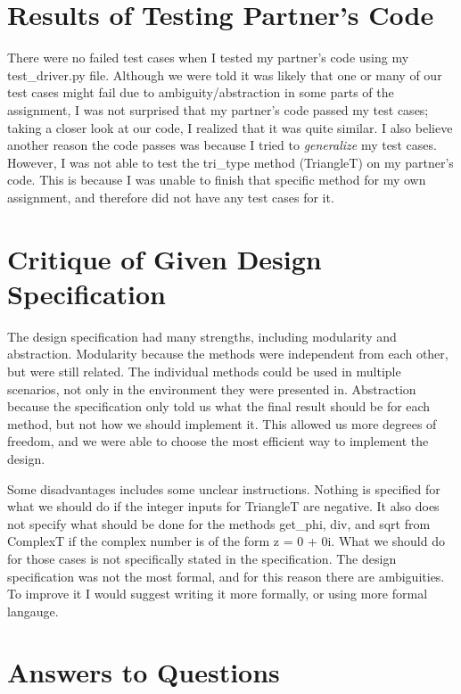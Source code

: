 \documentclass[12pt]{article}
\begin{document}
\section{Results of Testing Partner's Code}

There were no failed test cases when I tested my partner's code using my test\_driver.py file. Although we were told it was likely that one or many of our test cases might fail due to ambiguity/abstraction in some parts of the assignment, I was not surprised that my partner's code passed my test cases; taking a closer look at our code, I realized that it was quite similar. I also believe another reason the code passes was because I tried to \emph{generalize} my test cases. However, I was not able to test the tri\_type method (TriangleT) on my partner's code. This is because I was unable to finish that specific method for my own assignment, and therefore did not have any test cases for it. 

\section{Critique of Given Design Specification}

The design specification had many strengths, including modularity and abstraction. Modularity because the methods were independent from each other, but were still related. The individual methods could be used in multiple scenarios, not only in the environment they were presented in. Abstraction because the specification only told us what the final result should be for each method, but not how we should implement it. This allowed us more degrees of freedom, and we were able to choose the most efficient way to implement the design.


Some disadvantages includes some unclear instructions. Nothing is specified for what we should do if the integer inputs for TriangleT are negative. It also does not specify what should be done for the methods get\_phi, div, and sqrt from ComplexT if the complex number is of the form z = 0 + 0i. What we should do for those cases is not specifically stated in the specification. The design specification was not the most formal, and for this reason there are ambiguities. To improve it I would suggest writing it more formally, or using more formal langauge.

\section{Answers to Questions}
\end{document}
